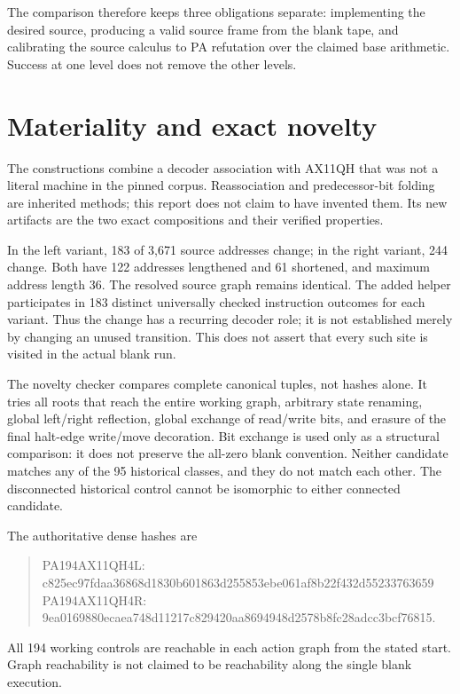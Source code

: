 \documentclass[10pt,letterpaper]{article}
\begin{document}
The comparison therefore keeps three obligations separate: implementing
the desired source, producing a valid source frame from the blank tape,
and calibrating the source calculus to PA refutation over the claimed base
arithmetic. Success at one level does not remove the other levels.



\section{Materiality and exact novelty}
\label{sec:novelty}

The constructions combine a decoder association with AX11QH that was not a
literal machine in the pinned corpus. Reassociation and predecessor-bit
folding are inherited methods; this report does not claim to have invented
them. Its new artifacts are the two exact compositions and their verified
properties.

In the left variant, 183 of 3,671 source addresses change; in the right
variant, 244 change. Both have 122 addresses lengthened and 61 shortened,
and maximum address length 36. The resolved source graph remains identical.
The added helper participates in 183 distinct universally checked instruction
outcomes for each variant. Thus the change has a recurring decoder role;
it is not established merely by changing an unused transition. This does
not assert that every such site is visited in the actual blank run.

The novelty checker compares complete canonical tuples, not hashes alone.
It tries all roots that reach the entire working graph, arbitrary state
renaming, global left/right reflection, global exchange of read/write bits,
and erasure of the final halt-edge write/move decoration. Bit exchange is
used only as a structural comparison: it does not preserve the all-zero
blank convention. Neither candidate matches any of the 95 historical
classes, and they do not match each other. The disconnected historical
control cannot be isomorphic to either connected candidate.



The authoritative dense hashes are
\begin{quote}\footnotesize\ttfamily
PA194AX11QH4L:\\
c825ec97fdaa36868d1830b601863d255853ebe061af8b22f432d55233763659\\[5pt]
PA194AX11QH4R:\\
9ea0169880ecaea748d11217c829420aa8694948d2578b8fc28adcc3bcf76815.
\end{quote}
All 194 working controls are reachable in each action graph from the
stated start. Graph reachability is not claimed to be reachability along
the single blank execution.
\end{document}

